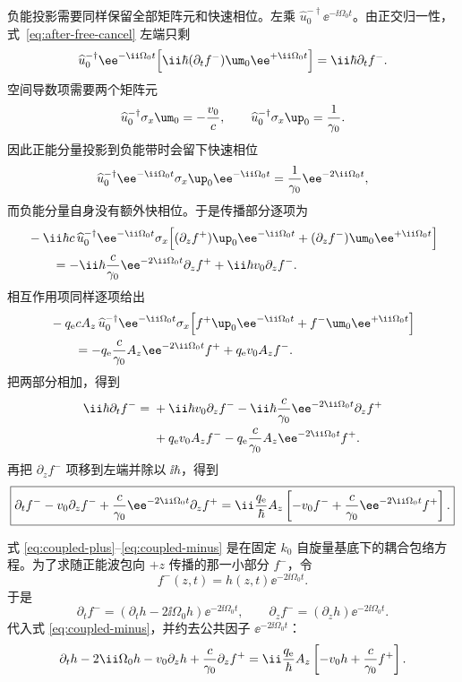 负能投影需要同样保留全部矩阵元和快速相位。左乘
$\widehat u_0^{-\dagger}\ee^{-\ii\Omega_0t}$。由正交归一性，式~\eqref{eq:after-free-cancel}
左端只剩
\[
 \widehat u_0^{-\dagger}\ee^{-\ii\Omega_0t}
 \Bigl[\ii\hbar(\partial_t f^-)\um_0\ee^{+\ii\Omega_0t}\Bigr]
 =\ii\hbar\partial_t f^-.
\]
空间导数项需要两个矩阵元
\[
 \widehat u_0^{-\dagger}\sigma_x\um_0=-\frac{v_0}{c},
 \qquad
 \widehat u_0^{-\dagger}\sigma_x\up_0=\frac1{\gamma_0}.
\]
因此正能分量投影到负能带时会留下快速相位
\[
 \widehat u_0^{-\dagger}\ee^{-\ii\Omega_0t}
 \sigma_x\up_0\ee^{-\ii\Omega_0t}
 =\frac1{\gamma_0}\ee^{-2\ii\Omega_0t},
\]
而负能分量自身没有额外快相位。于是传播部分逐项为
\begin{align}
 &-\ii\hbar c\,
 \widehat u_0^{-\dagger}\ee^{-\ii\Omega_0t}\sigma_x
 \Bigl[(\partial_z f^+)\up_0\ee^{-\ii\Omega_0t}
 +(\partial_z f^-)\um_0\ee^{+\ii\Omega_0t}\Bigr]\notag\\
 &\qquad=
 -\ii\hbar\frac{c}{\gamma_0}\ee^{-2\ii\Omega_0t}\partial_z f^+
 +\ii\hbar v_0\partial_z f^- .
\end{align}
相互作用项同样逐项给出
\begin{align}
 &-q_{\rm e}cA_z\,
 \widehat u_0^{-\dagger}\ee^{-\ii\Omega_0t}\sigma_x
 \Bigl[f^+\up_0\ee^{-\ii\Omega_0t}
 +f^-\um_0\ee^{+\ii\Omega_0t}\Bigr]\notag\\
 &\qquad=
 -q_{\rm e}\frac{c}{\gamma_0}A_z\ee^{-2\ii\Omega_0t}f^+
 +q_{\rm e}v_0A_zf^- .
\end{align}
把两部分相加，得到
\begin{align}
 \ii\hbar\partial_t f^-
 ={}&+\ii\hbar v_0\partial_z f^-
 -\ii\hbar\frac{c}{\gamma_0}\ee^{-2\ii\Omega_0t}\partial_z f^+\\
 &+q_{\rm e}v_0A_zf^-
 -q_{\rm e}\frac{c}{\gamma_0}A_z\ee^{-2\ii\Omega_0t}f^+.
\end{align}
再把 $\partial_z f^-$ 项移到左端并除以 $\ii\hbar$，得到
\begin{equation}
 \boxed{
 \partial_t f^-
 -v_0\partial_z f^-
 +\frac{c}{\gamma_0}\ee^{-2\ii\Omega_0t}\partial_z f^+
 =\ii\frac{q_{\rm e}}{\hbar}A_z
 \left[-v_0f^-
 +\frac{c}{\gamma_0}\ee^{-2\ii\Omega_0t}f^+\right].}
 \label{eq:coupled-minus}
\end{equation}

式 \eqref{eq:coupled-plus}--\eqref{eq:coupled-minus} 是在固定 $k_0$ 自旋量基底下的耦合包络方程。为了求随正能波包向 $+z$ 传播的那一小部分 $f^-$，令
\begin{equation}
 f^-(z,t)=h(z,t)\ee^{-2\ii\Omega_0t}.
 \label{eq:fminus-h}
\end{equation}
于是
\[
 \partial_t f^-=(\partial_t h-2\ii\Omega_0h)\ee^{-2\ii\Omega_0t},
 \qquad
 \partial_z f^-=(\partial_z h)\ee^{-2\ii\Omega_0t}.
\]
代入式 \eqref{eq:coupled-minus}，并约去公共因子 $\ee^{-2\ii\Omega_0t}$：
\begin{equation}
 \partial_t h-2\ii\Omega_0h-v_0\partial_z h
 +\frac{c}{\gamma_0}\partial_z f^+
 =\ii\frac{q_{\rm e}}{\hbar}A_z
 \left[-v_0h+\frac{c}{\gamma_0}f^+\right].
 \label{eq:h-exact}
\end{equation}

